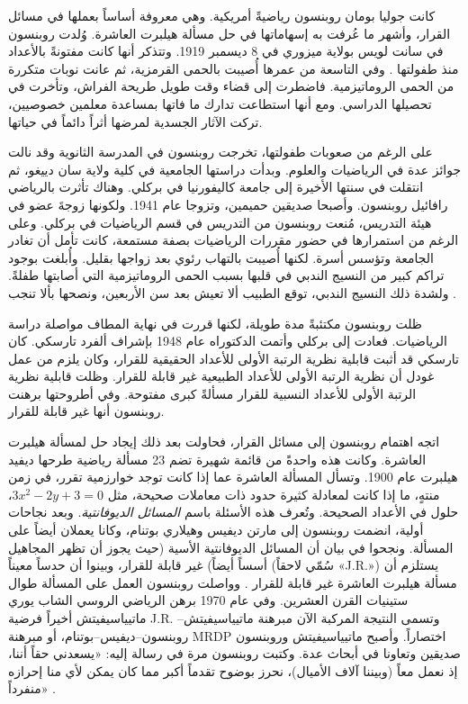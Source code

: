 \documentclass[../../../include/open-logic-section]{subfiles}
\begin{document}



كانت جوليا بومان روبنسون رياضيةً أمريكية. وهي معروفة أساساً بعملها في
مسائل القرار، وأشهر ما عُرفت به إسهاماتها في حل مسألة هيلبرت العاشرة.
وُلدت روبنسون في سانت لويس بولاية ميزوري في 8 ديسمبر 1919. وتتذكر أنها
كانت مفتونةً بالأعداد منذ طفولتها \citep[4]{Reid1986}. وفي التاسعة من
عمرها أُصيبت بالحمى القرمزية، ثم عانت نوبات متكررة من الحمى الروماتيزمية.
فاضطرت إلى قضاء وقت طويل طريحة الفراش، وتأخرت في تحصيلها الدراسي. ومع أنها
استطاعت تدارك ما فاتها بمساعدة معلمين خصوصيين، تركت الآثار الجسدية لمرضها
أثراً دائماً في حياتها.

على الرغم من صعوبات طفولتها، تخرجت روبنسون في المدرسة الثانوية وقد نالت
جوائز عدة في الرياضيات والعلوم. وبدأت دراستها الجامعية في كلية ولاية سان
دييغو، ثم انتقلت في سنتها الأخيرة إلى جامعة كاليفورنيا في بركلي. وهناك
تأثرت بالرياضي رافائيل روبنسون. وأصبحا صديقين حميمين، وتزوجا عام 1941.
ولكونها زوجةَ عضو في هيئة التدريس، مُنعت روبنسون من التدريس في قسم
الرياضيات في بركلي. وعلى الرغم من استمرارها في حضور مقررات الرياضيات بصفة
مستمعة، كانت تأمل أن تغادر الجامعة وتؤسس أسرة. لكنها أُصيبت بالتهاب رئوي
بعد زواجها بقليل. وأُبلغت بوجود تراكم كبير من النسيج الندبي في قلبها بسبب
الحمى الروماتيزمية التي أصابتها طفلةً. ولشدة ذلك النسيج الندبي، توقع
الطبيب ألا تعيش بعد سن الأربعين، ونصحها بألا تنجب
\citep[13]{Reid1986}.

ظلت روبنسون مكتئبةً مدة طويلة، لكنها قررت في نهاية المطاف مواصلة دراسة
الرياضيات. فعادت إلى بركلي وأتمت الدكتوراه عام 1948 بإشراف ألفرد تارسكي.
كان تارسكي قد أثبت قابلية نظرية الرتبة الأولى للأعداد الحقيقية للقرار،
وكان يلزم من عمل غودل أن نظرية الرتبة الأولى للأعداد الطبيعية غير قابلة
للقرار. وظلت قابلية نظرية الرتبة الأولى للأعداد النسبية للقرار مسألةً
كبرى مفتوحة. وفي أطروحتها \citeyearpar{Robinson1949} برهنت روبنسون أنها
غير قابلة للقرار.

اتجه اهتمام روبنسون إلى مسائل القرار، فحاولت بعد ذلك إيجاد حل لمسألة
هيلبرت العاشرة. وكانت هذه واحدةً من قائمة شهيرة تضم 23 مسألة رياضية طرحها
ديفيد هيلبرت عام 1900. وتسأل المسألة العاشرة عما إذا كانت توجد خوارزمية
تقرر، في زمن منتهٍ، ما إذا كانت لمعادلة كثيرة حدود ذات معاملات صحيحة، مثل
$3x^2 - 2y +3 = 0$، حلول في الأعداد الصحيحة. وتُعرف هذه الأسئلة باسم
\emph{المسائل الديوفانتية}. وبعد نجاحات أولية، انضمت روبنسون إلى مارتن
ديفيس وهيلاري بوتنام، وكانا يعملان أيضاً على المسألة. ونجحوا في بيان أن
المسائل الديوفانتية الأسية (حيث يجوز أن تظهر المجاهيل أسساً أيضاً) غير
قابلة للقرار، وبينوا أن حدساً معيناً (سُمّي لاحقاً «J.R.») يستلزم أن
مسألة هيلبرت العاشرة غير قابلة للقرار \citep{DavisPutnamRobinson1961}.
وواصلت روبنسون العمل على المسألة طوال ستينيات القرن العشرين. وفي عام 1970
برهن الرياضي الروسي الشاب يوري ماتيياسيفيتش أخيراً فرضية J.R. وتسمى
النتيجة المركبة الآن مبرهنة ماتيياسيفيتش--روبنسون--ديفيس--بوتنام، أو
مبرهنة MRDP اختصاراً. وأصبح ماتيياسيفيتش وروبنسون صديقين وتعاونا في أبحاث
عدة. وكتبت روبنسون مرة في رسالة إليه: «يسعدني حقاً أننا، إذ نعمل معاً
(وبيننا آلاف الأميال)، نحرز بوضوح تقدماً أكبر مما كان يمكن لأي منا إحرازه
منفرداً» \citep[45]{Matijasevich1992}.
\end{document}
